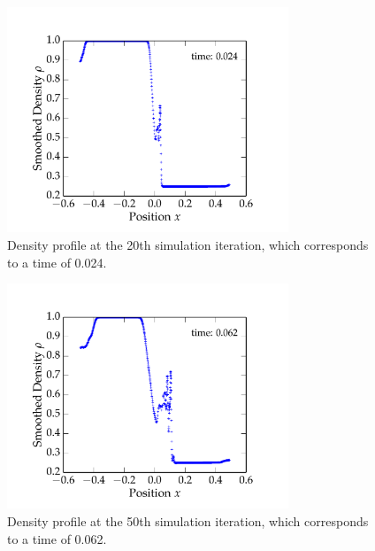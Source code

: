 \documentclass{article}
\begin{document}
\begin{spacing}{1.1}
\begin{figure}[H]
 \centering
 \hspace{0cm} \includegraphics[width=0.75\textwidth]{figs/fig_20.pdf}
 \caption{Density profile at the 20th simulation iteration, which corresponds to a time of 0.024.}
 \label{fig_20}
\end{figure} 

\begin{figure}[H]
 \centering
 \hspace{0cm} \includegraphics[width=0.75\textwidth]{figs/fig_50.pdf}
 \caption{Density profile at the 50th simulation iteration, which corresponds to a time of 0.062.}
 \label{fig_50}
\end{figure} 


\end{spacing}
\end{document}
